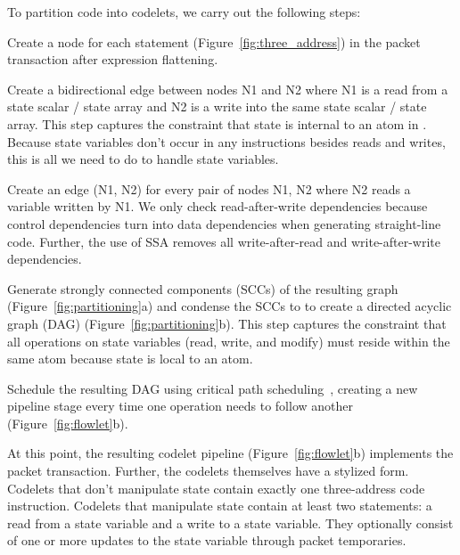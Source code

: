 To partition code into codelets, we carry out the following steps:
\begin{CompactEnumerate}
  \item Create a node for each statement (Figure~\ref{fig:three_address}) in
    the packet transaction after expression flattening.
  \item Create a bidirectional edge between nodes N1 and N2 where N1 is a read from a
    state scalar / state array and N2 is a write into the same state scalar /
    state array. This step captures the constraint that state is internal to an
    atom in \absmachine. Because state variables don't occur in any
    instructions besides reads and writes, this is all we need to do to handle
    state variables.
  \item Create an edge (N1, N2) for every pair of nodes N1, N2 where N2 reads
    a variable written by N1. We only check read-after-write dependencies because
    control dependencies turn into data dependencies when generating straight-line
    code. Further, the use of SSA removes all write-after-read and write-after-write
    dependencies.
  \item Generate strongly connected components (SCCs) of the resulting graph
    (Figure~\ref{fig:partitioning}a) and condense the SCCs to to create a directed
    acyclic graph (DAG) (Figure~\ref{fig:partitioning}b). This step captures the
    constraint that all operations on state variables (read, write, and modify)
    must reside within the same atom because state is local to an atom.
  \item Schedule the resulting DAG using critical path
    scheduling~\cite{crit_path_sched}, creating a new pipeline stage every time
    one operation needs to follow another (Figure~\ref{fig:flowlet}b).
\end{CompactEnumerate}
At this point, the resulting codelet pipeline (Figure~\ref{fig:flowlet}b)
implements the packet transaction.  Further, the codelets themselves have a
stylized form.  Codelets that don't manipulate state contain exactly one
three-address code instruction. Codelets that manipulate state contain at least
two statements: a read from a state variable and a write to a state variable.
They optionally consist of one or more updates to the state variable through
packet temporaries.

